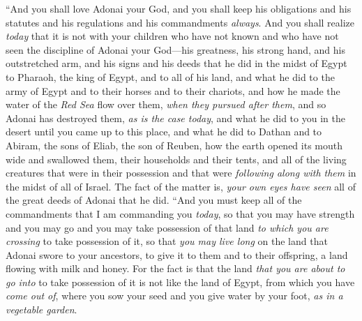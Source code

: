 \begin{biblechapter} %
\verse “And you shall love Adonai your God, and you shall keep his obligations and his statutes and his regulations and his commandments \textit{always}.
\verse And you shall realize \textit{today} that it is not with your children who have not known and who have not seen the discipline of Adonai your God—his greatness, his strong hand, and his outstretched arm,
\verse and his signs and his deeds that he did in the midst of Egypt to Pharaoh, the king of Egypt, and to all of his land,
\verse and what he did to the army of Egypt and to their horses and to their chariots, and how he made the water of the \textit{Red Sea} flow over them, \textit{when they pursued after them}, and so Adonai has destroyed them, \textit{as is the case today},
\verse and what he did to you in the desert until you came up to this place,
\verse and what he did to Dathan and to Abiram, the sons of Eliab, the son of Reuben, how the earth opened its mouth wide and swallowed them, their households and their tents, and all of the living creatures that were in their possession and that were \textit{following along with them} in the midst of all of Israel.
\verse The fact of the matter is, \textit{your own eyes have seen} all of the great deeds of Adonai that he did.
\verse “And you must keep all of the commandments that I am commanding you \textit{today}, so that you may have strength and you may go and you may take possession of that land \textit{to which you are crossing} to take possession of it,
\verse so that \textit{you may live long} on the land that Adonai swore to your ancestors, to give it to them and to their offspring, a land flowing with milk and honey.
\verse For the fact is that the land \textit{that you are about to go into} to take possession of it is not like the land of Egypt, from which you have \textit{come out of}, where you sow your seed and you give water by your foot, \textit{as in a vegetable garden}.

\end{biblechapter}
